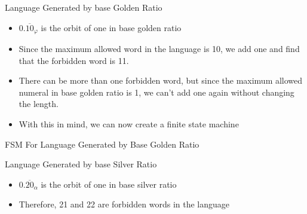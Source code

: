 \documentclass{beamer}
\begin{document}
            \begin{frame}{Language Generated by base Golden Ratio}
              \begin{itemize}
                \item $0.\overline{10}_\varphi$ is the orbit of one in base golden ratio
                \item Since the maximum allowed word in the language is 10, we add one and find that the forbidden word is 11.
                \item There can be more than one forbidden word, but since the maximum allowed numeral in base golden ratio is 1, we can't add one again without changing the length.
                \item With this in mind, we can now create a finite state machine
              \end{itemize}
            \end{frame}

            \begin{frame}{FSM For Language Generated by Base Golden Ratio}
              \begin{center}
              \end{center}
            \end{frame}

            \begin{frame}{Language Generated by base Silver Ratio}
              \begin{itemize}
                \item $0.\overline{20}_\alpha$ is the orbit of one in base silver ratio
                \item Therefore, 21 and 22 are forbidden words in the language
              \end{itemize}
            \end{frame}
\end{document}
